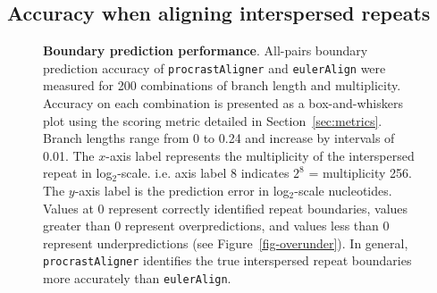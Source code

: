 \documentclass{llncs}
\begin{document}
\subsection{Accuracy when aligning interspersed repeats}
\begin{figure}[t]
\centering
{}
\caption{\textbf{Boundary prediction performance}. All-pairs boundary prediction accuracy of \texttt{procrastAligner} and \texttt{eulerAlign} were measured for 200 combinations of branch length and multiplicity.  Accuracy on each combination is presented as a box-and-whiskers plot using the scoring metric detailed in Section~\ref{sec:metrics}.  Branch lengths range from 0 to 0.24 and increase by intervals of 0.01.  The $x$-axis label represents the multiplicity of the interspersed repeat in log$_2$-scale. i.e. axis label 8 indicates $2^{8}$ = multiplicity 256. The $y$-axis label is the prediction error in log$_2$-scale nucleotides. Values at 0 represent correctly identified repeat boundaries, values greater than 0 represent overpredictions, and values less than 0 represent underpredictions (see Figure~\ref{fig-overunder}). In general, \texttt{procrastAligner} identifies the true interspersed repeat boundaries more accurately than \texttt{eulerAlign}.}
\label{fig-boundary}
\end{figure}
\end{document}
